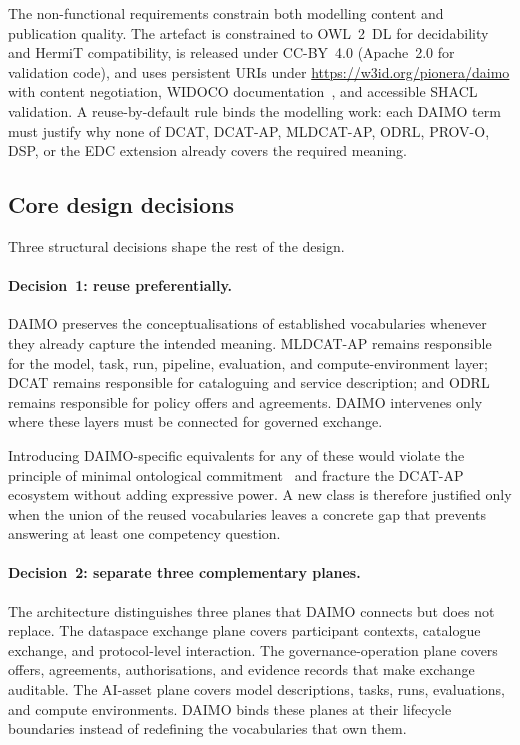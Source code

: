 \documentclass[11pt,a4paper]{article}
\begin{document}
The non-functional requirements constrain both modelling content and publication quality. The artefact is constrained to OWL~2~DL for decidability and HermiT compatibility, is released under CC-BY~4.0 (Apache~2.0 for validation code), and uses persistent URIs under \url{https://w3id.org/pionera/daimo} with content negotiation, WIDOCO documentation~\cite{widoco}, and accessible SHACL validation. A reuse-by-default rule binds the modelling work: each DAIMO term must justify why none of DCAT, DCAT-AP, MLDCAT-AP, ODRL, PROV-O, DSP, or the EDC extension already covers the required meaning.

\subsection{Core design decisions}\label{sec:method-design}

Three structural decisions shape the rest of the design.

\paragraph{Decision~1: reuse preferentially.} DAIMO preserves the conceptualisations of established vocabularies whenever they already capture the intended meaning. MLDCAT-AP remains responsible for the model, task, run, pipeline, evaluation, and compute-environment layer; DCAT remains responsible for cataloguing and service description; and ODRL remains responsible for policy offers and agreements. DAIMO intervenes only where these layers must be connected for governed exchange.

Introducing DAIMO-specific equivalents for any of these would violate the principle of minimal ontological commitment~\cite{gruber95} and fracture the DCAT-AP ecosystem without adding expressive power. A new class is therefore justified only when the union of the reused vocabularies leaves a concrete gap that prevents answering at least one competency question.

\paragraph{Decision~2: separate three complementary planes.} The architecture distinguishes three planes that DAIMO connects but does not replace. The dataspace exchange plane covers participant contexts, catalogue exchange, and protocol-level interaction. The governance-operation plane covers offers, agreements, authorisations, and evidence records that make exchange auditable. The AI-asset plane covers model descriptions, tasks, runs, evaluations, and compute environments. DAIMO binds these planes at their lifecycle boundaries instead of redefining the vocabularies that own them.
\end{document}
